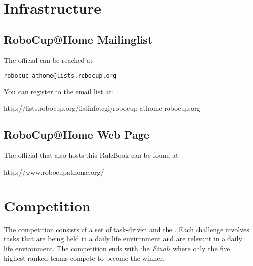 \section{Infrastructure}
\label{sec:infrastructure}
\subsection{RoboCup@Home Mailinglist}
The official  can be reached at
\begin{center}
\texttt{robocup-athome@lists.robocup.org}
\end{center}
You can register to the email list at:
\begin{center}
http://lists.robocup.org/listinfo.cgi/robocup-athome-robocup.org
\end{center}

\subsection{RoboCup@Home Web Page}
The official  that also hosts this RuleBook can be found at \\
\begin{center}
http://www.robocupathome.org/
\end{center}


\section{Competition}
The competition consists of a set of task-driven  and the . 
Each challenge involves tasks that are being held in a daily life environment and are relevant in a daily life environment. 
The competition ends with the \emph{Finals} where only the five highest ranked teams compete to become the winner.

